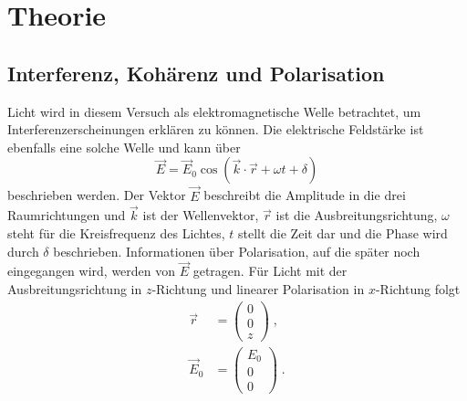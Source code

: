 \section{Theorie}
\label{sec:Theorie}

\subsection{Interferenz, Kohärenz und Polarisation}
\label{sec:polarisation}
Licht wird in diesem Versuch als elektromagnetische Welle betrachtet, um Interferenzerscheinungen erklären zu können. Die elektrische Feldstärke ist 
ebenfalls eine solche Welle und kann über 
\begin{equation}
    \vec{E} = \vec{E}_0\cos{(\vec{k}\cdot \vec{r}+\omega t+ \delta)}
    \label{eqn:EVektor}
\end{equation}
beschrieben werden. Der Vektor $\vec{E}$ beschreibt die Amplitude in die drei Raumrichtungen und $\vec{k}$ ist der Wellenvektor, $\vec{r}$ ist die Ausbreitungsrichtung, $\omega$ steht für die Kreisfrequenz des Lichtes, $t$ stellt die Zeit dar und die Phase wird durch $\delta$ beschrieben. Informationen über Polarisation, auf die später noch eingegangen wird, werden von $\vec{E}$ getragen. Für Licht mit der Ausbreitungsrichtung in $z$-Richtung und linearer Polarisation in $x$-Richtung folgt
\begin{align*}
    \vec{r}&= \left(\begin{array}{c}0 \\ 0 \\ z\end{array}\right) \; ,\\
    \vec{E}_0&= \left(\begin{array}{c} E_0 \\ 0 \\ 0\end{array}\right)\; .
\end{align*}

